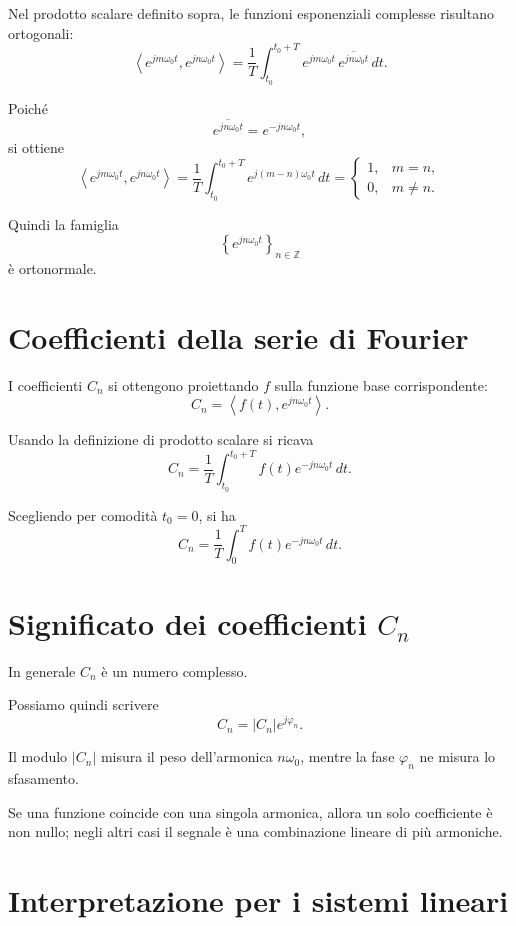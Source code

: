 Nel prodotto scalare definito sopra, le funzioni esponenziali complesse risultano ortogonali:
\[
\left\langle e^{j m\omega_0 t}, e^{j n\omega_0 t}\right\rangle
=
\frac{1}{T}\int_{t_0}^{t_0+T}
e^{j m\omega_0 t}\,\overline{e^{j n\omega_0 t}}\,dt.
\]

Poiché
\[
\overline{e^{j n\omega_0 t}}=e^{-j n\omega_0 t},
\]
si ottiene
\[
\left\langle e^{j m\omega_0 t}, e^{j n\omega_0 t}\right\rangle
=
\frac{1}{T}\int_{t_0}^{t_0+T} e^{j(m-n)\omega_0 t}\,dt
=
\begin{cases}
1, & m=n,\\
0, & m\neq n.
\end{cases}
\]

Quindi la famiglia
\[
\left\{e^{j n\omega_0 t}\right\}_{n\in\mathbb{Z}}
\]
è ortonormale.

\section{Coefficienti della serie di Fourier}

I coefficienti \(C_n\) si ottengono proiettando \(f\) sulla funzione base corrispondente:
\[
C_n=\left\langle f(t), e^{j n\omega_0 t}\right\rangle.
\]

Usando la definizione di prodotto scalare si ricava
\[
C_n
=
\frac{1}{T}\int_{t_0}^{t_0+T} f(t)e^{-j n\omega_0 t}\,dt.
\]

Scegliendo per comodità \(t_0=0\), si ha
\[
C_n
=
\frac{1}{T}\int_0^T f(t)e^{-j n\omega_0 t}\,dt.
\]

\section{Significato dei coefficienti \(C_n\)}

In generale \(C_n\) è un numero complesso.

Possiamo quindi scrivere
\[
C_n = |C_n| e^{j\varphi_n}.
\]

Il modulo \(|C_n|\) misura il peso dell'armonica \(n\omega_0\),
mentre la fase \(\varphi_n\) ne misura lo sfasamento.

Se una funzione coincide con una singola armonica, allora un solo coefficiente è non nullo;
negli altri casi il segnale è una combinazione lineare di più armoniche.

\section{Interpretazione per i sistemi lineari}

